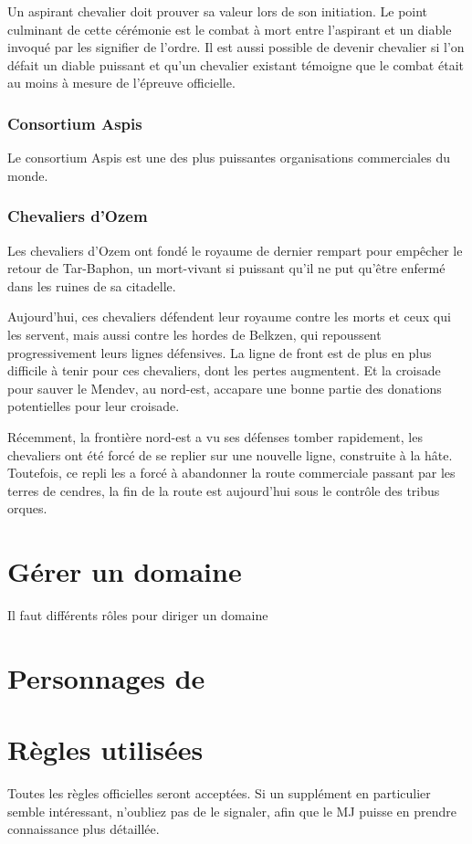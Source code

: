 \documentclass[letterpaper,10pt,twoside,twocolumn,openany]{book}
\begin{document}
Un aspirant chevalier doit prouver sa valeur lors de son initiation. Le point culminant de cette cérémonie est le combat à mort entre l'aspirant et un diable invoqué par les signifier de l'ordre. Il est aussi possible de devenir chevalier si l'on défait un diable puissant et qu'un chevalier existant témoigne que le combat était au moins à mesure de l'épreuve officielle.
\subsection{Consortium Aspis}
Le consortium Aspis est une des plus puissantes organisations commerciales du monde.
\subsection{Chevaliers d'Ozem}
Les chevaliers d'Ozem ont fondé le royaume de dernier rempart pour empêcher le retour de Tar-Baphon, un mort-vivant si puissant qu'il ne put qu'être enfermé dans les ruines de sa citadelle.

Aujourd'hui, ces chevaliers défendent leur royaume contre les morts et ceux qui les servent, mais aussi contre les hordes de Belkzen, qui repoussent progressivement leurs lignes défensives. La ligne de front est de plus en plus difficile à tenir pour ces chevaliers, dont les pertes augmentent. Et la croisade pour sauver le Mendev, au nord-est, accapare une bonne partie des donations potentielles pour leur croisade.

Récemment, la frontière nord-est a vu ses défenses tomber rapidement, les chevaliers ont été forcé de se replier sur une nouvelle ligne, construite à la hâte. Toutefois, ce repli les a forcé à abandonner la route commerciale passant par les terres de cendres, la fin de la route est aujourd'hui sous le contrôle des tribus orques.
\chapter{Gérer un domaine}
Il faut différents rôles pour diriger un domaine
\chapter{Personnages de \nomcampagne}
\chapter{Règles utilisées}
Toutes les règles officielles seront acceptées. Si un supplément en particulier semble intéressant, n'oubliez pas de le signaler, afin que le MJ puisse en prendre connaissance plus détaillée. 
\end{document}
